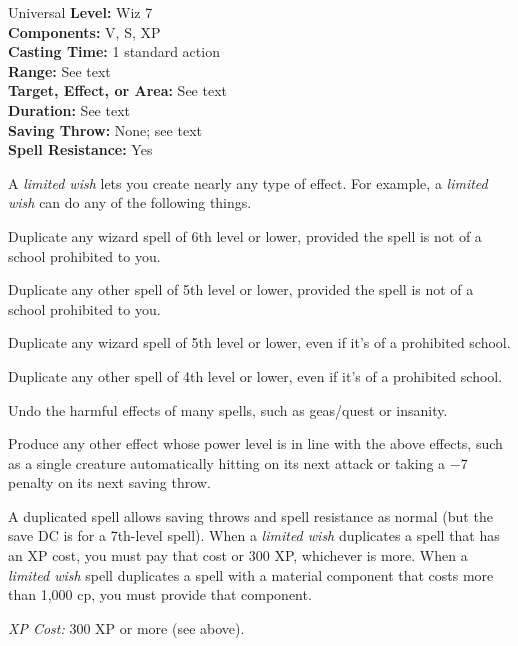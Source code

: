 {Universal}
{
	\textbf{Level:}
	Wiz 7\\
	\textbf{Components:}
	V, S, XP\\
	\textbf{Casting Time:}
	1 standard action\\
	\textbf{Range:}
	See text\\
	\textbf{Target, Effect, or Area:}
	See text\\
	\textbf{Duration:}
	See text\\
	\textbf{Saving Throw:}
	None; see text\\
	\textbf{Spell Resistance:}
	Yes\\
}
{
	A \emph{limited wish} lets you create nearly any type of effect. For example, a \emph{limited wish} can do any of the following things.

	\begin{itemize*}
	\item Duplicate any wizard spell of 6th level or lower, provided the spell is not of a school prohibited to you.
	\item Duplicate any other spell of 5th level or lower, provided the spell is not of a school prohibited to you.
	\item Duplicate any wizard spell of 5th level or lower, even if it's of a prohibited school.
	\item Duplicate any other spell of 4th level or lower, even if it's of a prohibited school.
	\item Undo the harmful effects of many spells, such as geas/quest or insanity.
	\item Produce any other effect whose power level is in line with the above effects, such as a single creature automatically hitting on its next attack or taking a $-7$ penalty on its next saving throw.
	\end{itemize*}

	A duplicated spell allows saving throws and spell resistance as normal (but the save DC is for a 7th-level spell). When a \emph{limited wish} duplicates a spell that has an XP cost, you must pay that cost or 300 XP, whichever is more. When a \emph{limited wish} spell duplicates a spell with a material component that costs more than 1,000 cp, you must provide that component.

	\textit{XP Cost:}
	300 XP or more (see above).

}

